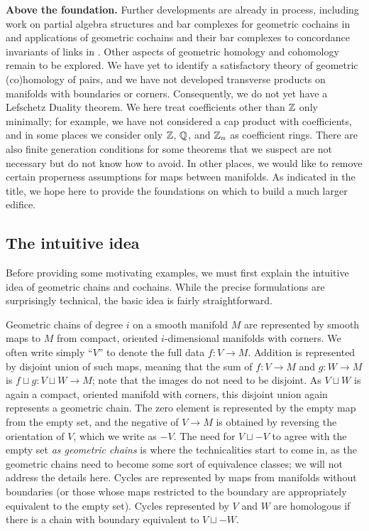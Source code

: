 \textbf{Above the foundation.} Further developments are already in process, including work on partial algebra structures and bar complexes for geometric cochains in \cite{GBF47} and applications of geometric cochains and their bar complexes to concordance invariants of links in \cite{FGKSW}.
Other aspects of geometric homology and cohomology remain to be explored.
We have yet to identify a satisfactory theory of geometric (co)homology of pairs, and we have not developed transverse products on manifolds with boundaries or corners.
Consequently, we do not yet have a Lefschetz Duality theorem.
We here treat coefficients other than $\mathbb{Z}$ only minimally; for example, we have not considered a cap product with coefficients, and in some places we consider only $\mathbb{Z}$, $\mathbb{Q}$, and $\mathbb{Z}_n$ as coefficient rings.
There are also finite generation conditions for some theorems that we suspect are not necessary but do not know how to avoid.
In other places, we would like to remove certain properness assumptions for maps between manifolds.
As indicated in the title, we hope here to provide the foundations on which to build a much larger edifice.



\subsection{The intuitive idea}

Before providing some motivating examples, we must first explain the intuitive idea of geometric chains and cochains.
While the precise formulations are surprisingly technical, the basic idea is fairly straightforward.

Geometric chains of degree $i$ on a smooth manifold $M$ are represented by smooth maps to $M$ from compact, oriented $i$-dimensional manifolds with corners.
We often write simply ``$V$'' to denote the full data $f \colon V \to M$.
Addition is represented by disjoint union of such maps, meaning that the sum of $f \colon V \to M$ and $g \colon W \to M$ is $f \sqcup g \colon V \sqcup W \to M$; note that the images do not need to be disjoint.
As $V \sqcup W$ is again a compact, oriented manifold with corners, this disjoint union again represents a geometric chain.
The zero element is represented by the empty map from the empty set, and the negative of $V \to M$ is obtained by reversing the orientation of $V$, which we write as $-V$.
The need for $V \sqcup -V$ to agree with the empty set \textit{as geometric chains} is where the technicalities start to come in, as the geometric chains need to become some sort of equivalence classes; we will not address the details here.
Cycles are represented by maps from manifolds without boundaries (or those whose maps restricted to the boundary are appropriately equivalent to the empty set).
Cycles represented by $V$ and $W$ are homologous if there is a chain with boundary equivalent to $V \sqcup -W$.

